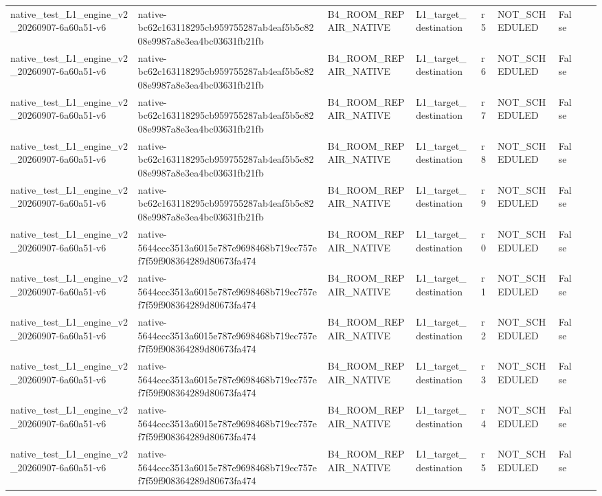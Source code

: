 \begin{tabular}{lllllllll}
native\_test\_L1\_engine\_v2\_20260907-6a60a51-v6 & native-bc62c163118295cb959755287ab4eaf5b5c8208e9987a8e3ea4bc03631fb21fb & B4\_ROOM\_REPAIR\_NATIVE & L1\_target\_destination & r5 & NOT\_SCHEDULED & False &  &  \\
native\_test\_L1\_engine\_v2\_20260907-6a60a51-v6 & native-bc62c163118295cb959755287ab4eaf5b5c8208e9987a8e3ea4bc03631fb21fb & B4\_ROOM\_REPAIR\_NATIVE & L1\_target\_destination & r6 & NOT\_SCHEDULED & False &  &  \\
native\_test\_L1\_engine\_v2\_20260907-6a60a51-v6 & native-bc62c163118295cb959755287ab4eaf5b5c8208e9987a8e3ea4bc03631fb21fb & B4\_ROOM\_REPAIR\_NATIVE & L1\_target\_destination & r7 & NOT\_SCHEDULED & False &  &  \\
native\_test\_L1\_engine\_v2\_20260907-6a60a51-v6 & native-bc62c163118295cb959755287ab4eaf5b5c8208e9987a8e3ea4bc03631fb21fb & B4\_ROOM\_REPAIR\_NATIVE & L1\_target\_destination & r8 & NOT\_SCHEDULED & False &  &  \\
native\_test\_L1\_engine\_v2\_20260907-6a60a51-v6 & native-bc62c163118295cb959755287ab4eaf5b5c8208e9987a8e3ea4bc03631fb21fb & B4\_ROOM\_REPAIR\_NATIVE & L1\_target\_destination & r9 & NOT\_SCHEDULED & False &  &  \\
native\_test\_L1\_engine\_v2\_20260907-6a60a51-v6 & native-5644ccc3513a6015e787e9698468b719ec757ef7f59f908364289d80673fa474 & B4\_ROOM\_REPAIR\_NATIVE & L1\_target\_destination & r0 & NOT\_SCHEDULED & False &  &  \\
native\_test\_L1\_engine\_v2\_20260907-6a60a51-v6 & native-5644ccc3513a6015e787e9698468b719ec757ef7f59f908364289d80673fa474 & B4\_ROOM\_REPAIR\_NATIVE & L1\_target\_destination & r1 & NOT\_SCHEDULED & False &  &  \\
native\_test\_L1\_engine\_v2\_20260907-6a60a51-v6 & native-5644ccc3513a6015e787e9698468b719ec757ef7f59f908364289d80673fa474 & B4\_ROOM\_REPAIR\_NATIVE & L1\_target\_destination & r2 & NOT\_SCHEDULED & False &  &  \\
native\_test\_L1\_engine\_v2\_20260907-6a60a51-v6 & native-5644ccc3513a6015e787e9698468b719ec757ef7f59f908364289d80673fa474 & B4\_ROOM\_REPAIR\_NATIVE & L1\_target\_destination & r3 & NOT\_SCHEDULED & False &  &  \\
native\_test\_L1\_engine\_v2\_20260907-6a60a51-v6 & native-5644ccc3513a6015e787e9698468b719ec757ef7f59f908364289d80673fa474 & B4\_ROOM\_REPAIR\_NATIVE & L1\_target\_destination & r4 & NOT\_SCHEDULED & False &  &  \\
native\_test\_L1\_engine\_v2\_20260907-6a60a51-v6 & native-5644ccc3513a6015e787e9698468b719ec757ef7f59f908364289d80673fa474 & B4\_ROOM\_REPAIR\_NATIVE & L1\_target\_destination & r5 & NOT\_SCHEDULED & False &  &  \\

\end{tabular}
